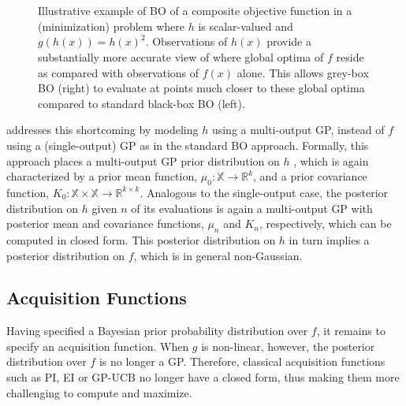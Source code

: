 \documentclass{wscpaperproc}
\newcommand{\R}{\mathbb{R}}
\newcommand{\X}{\mathbb{X}}
\theoremstyle{wsc}
\begin{document}
\begin{figure*}
\hfill
{}
\\
\hfill
{}
\\
\hfill
{}
\caption{Illustrative example of BO of a composite objective function in a (minimization) problem where $h$ is scalar-valued and $g(h(x))=h(x)^2$. 
Observations of $h(x)$ provide a substantially more accurate view of where global optima of $f$ reside as compared with observations of $f(x)$ alone.  This allows  grey-box BO  (right) to evaluate at points much closer to these global optima compared to standard black-box BO (left).
\label{fig:bocf_vs_bo}}
\end{figure*}

 addresses this shortcoming by modeling $h$ using a multi-output GP, instead of  $f$ using a (single-output) GP as in the standard BO approach. Formally, this approach places a multi-output GP prior distribution on $h$ , which is again characterized by a prior mean function, $\mu_0:\X \rightarrow \R^k$, and a prior covariance function, $K_0:\X\times\X\rightarrow\R^{k\times k}$. Analogous to the single-output case, the posterior distribution on $h$ given $n$ of its evaluations is again a multi-output GP with posterior mean and covariance functions, $\mu_n$ and $K_n$, respectively, which can be computed in closed form. This posterior distribution on $h$ in turn implies a posterior distribution on $f$, which is in general non-Gaussian.

\subsection{Acquisition Functions}
Having specified a Bayesian prior probability distribution over $f$, it remains to specify an acquisition function.  When $g$ is non-linear, however, the posterior distribution over $f$ is no longer a GP. Therefore, classical acquisition functions such as PI, EI or GP-UCB no longer have a closed form, thus making them more challenging to compute and maximize.
\end{document}
